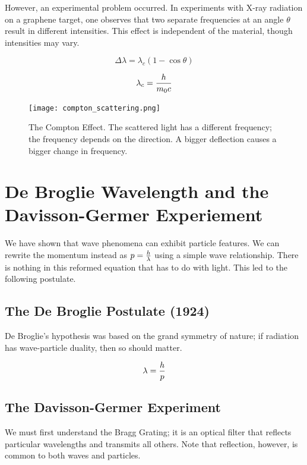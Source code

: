 \documentclass[english, 11pt]{article}
\begin{document}
       However, an experimental problem occurred. In experiments with X-ray radiation on a graphene target, one observes that two separate frequencies at an angle $\theta$ result in different intensities. This effect is independent of the material, though intensities may vary.
       \newline

       \begin{defn}\label{compton_shift}
         \[ \Delta \lambda = \lambda_c (1 - \cos \theta) \]
       \end{defn}

       \begin{defn}\label{compton_wavelength}
         \[ \lambda_c = \frac{h}{m_0c} \]
       \end{defn}

       \begin{figure}[t]
         \centering
           \texttt{[image: compton\_scattering.png]}
         \caption{The Compton Effect. The scattered light has a different frequency; the frequency depends on the direction. A bigger deflection causes a bigger change in frequency.}
       \end{figure}

   \section{De Broglie Wavelength and the Davisson-Germer Experiement}

     We have shown that wave phenomena can exhibit particle features. We can rewrite the momentum instead as $p = \frac{h}{\lambda}$ using a simple wave relationship. There is nothing in this reformed equation that has to do with light. This led to the following postulate.

     \subsection{The De Broglie Postulate (1924)}
       De Broglie's hypothesis was based on the grand symmetry of nature; if radiation has wave-particle duality, then so should matter.
       \begin{defn}\label{de_broglie_relation}
         \[ \lambda = \frac{h}{p} \]
       \end{defn}

     \subsection{The Davisson-Germer Experiment}
       We must first understand the Bragg Grating; it is an optical filter that reflects particular wavelengths and transmits all others. Note that reflection, however, is common to both waves and particles.
\end{document}
